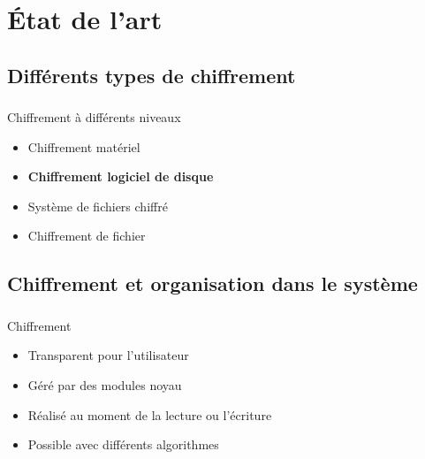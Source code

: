 \section{État de l'art}

\subsection{Différents types de chiffrement}

\begin{frame}
  \frametitle{\insertsubsectionhead}
  \pause
  \begin{block}{Chiffrement à différents niveaux}
    \begin{itemize}
    \item Chiffrement matériel
    \item \textbf{Chiffrement logiciel de disque}
    \item Système de fichiers chiffré
    \item Chiffrement de fichier
    \end{itemize}
  \end{block}
\end{frame}

\subsection{Chiffrement et organisation dans le système}

\begin{frame}
  \frametitle{\insertsubsectionhead}
  \pause
  \begin{block}{Chiffrement}
    \begin{itemize}
      \pause
    \item Transparent pour l'utilisateur
    \item Géré par des modules noyau
    \item Réalisé au moment de la lecture ou l'écriture
    \item Possible avec différents algorithmes
    \end{itemize}
  \end{block}
\end{frame}

